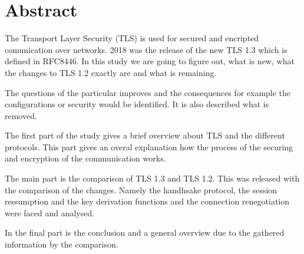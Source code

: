 \chapter*{Abstract}
\label{chap:abstract}
The Transport Layer Security (TLS) is used for secured and encripted comunication over networks. 2018 was the release of the new TLS 1.3 which is defined in RFC8446. In this study we are going to figure out, what is new, what the changes to TLS 1.2 exactly are and what is remaining. 

The questions of the particular improves and the consequences for example the configurations or security would be identified. It is also described what is removed. 

The first part of the study gives a brief overview about TLS and the different protocols. This part gives an overal explanation how the process of the securing and encryption of the communication works. 

The main part is the comparison of TLS 1.3 and TLS 1.2. This was released with the comparison of the changes. Namely the handhsake protocol, the session ressumption and the key derivation functions and the connection renegotiation were faced and analysed.

In the final part is the conclusion and a general overview due to the gathered information by the comparison.



